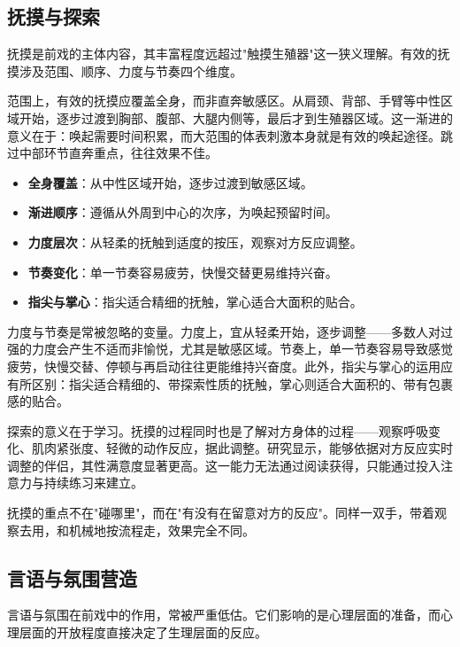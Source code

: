 \documentclass[12pt,UTF8]{ctexbook}
\newcommand{\keyword}[1]{\textbf{#1}}
\begin{document}
\subsection{抚摸与探索}

抚摸是前戏的主体内容，其丰富程度远超过"触摸生殖器"这一狭义理解。有效的抚摸涉及范围、顺序、力度与节奏四个维度。

范围上，有效的抚摸应覆盖全身，而非直奔敏感区。从肩颈、背部、手臂等中性区域开始，逐步过渡到胸部、腹部、大腿内侧等，最后才到生殖器区域。这一渐进的意义在于：唤起需要时间积累，而大范围的体表刺激本身就是有效的唤起途径。跳过中部环节直奔重点，往往效果不佳。

\begin{itemize}
  \item \keyword{全身覆盖}：从中性区域开始，逐步过渡到敏感区域。
  \item \keyword{渐进顺序}：遵循从外周到中心的次序，为唤起预留时间。
  \item \keyword{力度层次}：从轻柔的抚触到适度的按压，观察对方反应调整。
  \item \keyword{节奏变化}：单一节奏容易疲劳，快慢交替更易维持兴奋。
  \item \keyword{指尖与掌心}：指尖适合精细的抚触，掌心适合大面积的贴合。
\end{itemize}

力度与节奏是常被忽略的变量。力度上，宜从轻柔开始，逐步调整——多数人对过强的力度会产生不适而非愉悦，尤其是敏感区域。节奏上，单一节奏容易导致感觉疲劳，快慢交替、停顿与再启动往往更能维持兴奋度。此外，指尖与掌心的运用应有所区别：指尖适合精细的、带探索性质的抚触，掌心则适合大面积的、带有包裹感的贴合。

探索的意义在于学习。抚摸的过程同时也是了解对方身体的过程——观察呼吸变化、肌肉紧张度、轻微的动作反应，据此调整。研究显示，能够依据对方反应实时调整的伴侣，其性满意度显著更高。这一能力无法通过阅读获得，只能通过投入注意力与持续练习来建立。

\begin{tcolorbox}[colback=pink!5!white,colframe=red!50!black,title=贴心小叮咛]
抚摸的重点不在"碰哪里"，而在"有没有在留意对方的反应"。同样一双手，带着观察去用，和机械地按流程走，效果完全不同。
\end{tcolorbox}
\subsection{言语与氛围营造}

言语与氛围在前戏中的作用，常被严重低估。它们影响的是心理层面的准备，而心理层面的开放程度直接决定了生理层面的反应。
\end{document}

